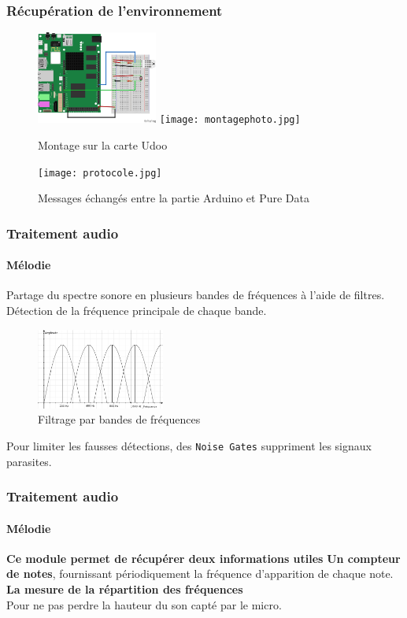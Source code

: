 \documentclass{beamer}
\begin{document}
\begin{frame}
\frametitle{Récupération de l'environnement}
\begin{figure}
  \centering
  \includegraphics[width=150px]{montage.jpg}  
  \hspace{15px}
  \texttt{[image: montagephoto.jpg]} 
	\caption{Montage sur la carte Udoo}
\end{figure}
\begin{figure}
\centering
\vspace{-0.5cm}
\texttt{[image: protocole.jpg]}
\caption{Messages échangés entre la partie Arduino et Pure Data}
\end{figure}
\end{frame}

\begin{frame}
\frametitle{Traitement audio}
\framesubtitle{Mélodie}
Partage du spectre sonore en plusieurs bandes de fréquences à l'aide de filtres.\\
Détection de la fréquence principale de chaque bande.
\begin{figure}
\centering
\includegraphics[height=100px]{filtre.jpg}
\caption{Filtrage par bandes de fréquences}
\end{figure}
Pour limiter les fausses détections, des \texttt{Noise Gates} suppriment les signaux parasites.
\end{frame}


\begin{frame}
\frametitle{Traitement audio}
\framesubtitle{Mélodie}
\textbf{Ce module permet de récupérer deux informations utiles}
\newline
\newline
\textbf{Un compteur de notes}, fournissant périodiquement la fréquence d'apparition de chaque note.
\newline
\newline
\textbf{La mesure de la répartition des fréquences}\\
Pour ne pas perdre la hauteur du son capté par le micro.
\end{frame}
\end{document}
